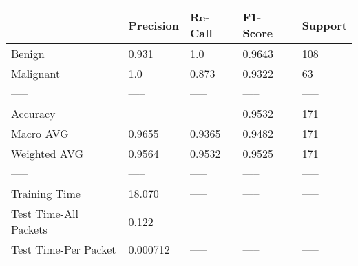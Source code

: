 \begin{tabular}{lllll}
\toprule
{} & Precision & Re-Call & F1-Score & Support \\
\midrule
Benign                &     0.931 &     1.0 &   0.9643 &     108 \\
Malignant             &       1.0 &   0.873 &   0.9322 &      63 \\
-----                 &     ----- &   ----- &    ----- &   ----- \\
Accuracy              &           &         &   0.9532 &     171 \\
Macro AVG             &    0.9655 &  0.9365 &   0.9482 &     171 \\
Weighted AVG          &    0.9564 &  0.9532 &   0.9525 &     171 \\
-----                 &     ----- &   ----- &    ----- &   ----- \\
Training Time         &    18.070 &   ----- &    ----- &   ----- \\
Test Time-All Packets &     0.122 &   ----- &    ----- &   ----- \\
Test Time-Per Packet  &  0.000712 &   ----- &    ----- &   ----- \\
\bottomrule
\end{tabular}
